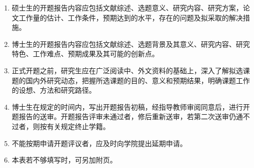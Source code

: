 \begin{enumerate}[label=\chinese*、,leftmargin=2em,labelsep=0pt,itemsep=8pt,topsep=0pt]
  \item 硕士生的开题报告内容应包括文献综述、选题意义、研究内容、研究方案，论文工作量的估计、工作条件，预期达到的水平，存在的问题及拟采取的解决措施。
  \item 博士生的开题报告内容应包括文献综述、选题背景及其意义、研究内容、研究特色、工作难点、预期成果及其可能的创新点。
  \item 正式开题之前，研究生应在广泛阅读中、外文资料的基础上，深入了解拟选课题的国内外研究动态，把握所选课题的目的、意义和预期结果，明确课题工作的设想、方法和研究路径。
  \item 博士生在规定的时间内，写出开题报告初稿，经指导教师审阅同意后，进行开题报告的送审。开题报告评审未通过者，修后重新送审，若第二次送审仍通不过者，则按有关规定终止学籍。
  \item 不能按期申请开题评议者，应及时向学院提出延期申请。
  \item 本表若不够填写时，可另加附页。
\end{enumerate}
